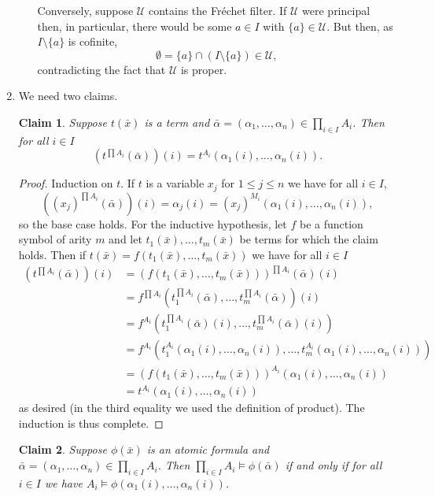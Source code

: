 \documentclass{article}
\theoremstyle{theorem}
\newtheorem{claim}{Claim}
\begin{document}
\begin{enumerate}[leftmargin=*]
\begin{enumerate}
			Conversely, suppose $\mathcal{U}$ contains the Fréchet filter. If $\mathcal{U}$ were principal then, in particular, there would be some $a\in I$ with $\{a\}\in\mathcal{U}$. But then, as $I\setminus\{a\}$ is cofinite,
			\[
				\emptyset= \{a\} \cap (I \setminus\{a\}) \in\mathcal{U},
			\]
			contradicting the fact that $\mathcal{U}$ is proper.
		\end{enumerate}
		\item We need two claims.
		\begin{claim}
			Suppose $t(\bar{x})$ is a term and $\bar{\alpha} = (\alpha_1,\ldots,\alpha_n)\in \prod_{i\in I} A_i$. Then for all $i\in I$
			\[
				\left(t^{\prod A_i}(\bar{\alpha})\right)(i) = t^{A_i}(\alpha_1(i),\ldots,\alpha_n(i)).
			\]
		\end{claim}
		\begin{proof}
			Induction on $t$. If $t$ is a variable $x_j$ for $1\leq j\leq n$ we have for all $i\in I$,
			\[
				\left((x_j)^{\prod A_i}(\bar{\alpha})\right)(i) =\alpha_j(i) = (x_j)^{M_i}(\alpha_1(i),\ldots,\alpha_n(i)), 
			\]
			so the base case holds. For the inductive hypothesis, let $f$ be a function symbol of arity $m$ and let $t_1(\bar{x}),\ldots, t_m(\bar{x})$ be terms for which the claim holds. Then if $t(\bar{x}) = f(t_1(\bar{x}),\ldots, t_m(\bar{x}))$ we have for all $i\in I$
			\begin{align*}
				\left(t^{\prod A_i}(\bar{\alpha})\right)(i) &= (f(t_1(\bar{x}),\ldots,t_m(\bar{x})))^{\prod A_i}(\bar{\alpha})(i) \\
				&= f^{\prod A_i}(t_1^{\prod A_i}(\bar{\alpha}), \ldots, t_m^{\prod A_i}(\bar{\alpha}))(i)\\
				&= f^{A_i}(t_1^{\prod A_i}(\bar{\alpha})(i), \ldots, t_m^{\prod A_i}(\bar{\alpha})(i))\\
				&= f^{A_i}(t_1^{A_i}(\alpha_1(i),\ldots, \alpha_n(i)),\ldots, t_m^{A_i}(\alpha_1(i),\ldots, \alpha_n(i)))\\
				&= (f(t_1(\bar{x}),\ldots,t_m(\bar{x})))^{A_i}(\alpha_1(i),\ldots, \alpha_n(i))\\
				&= t^{A_i}(\alpha_1(i),\ldots, \alpha_n(i))
			\end{align*}
			as desired (in the third equality we used the definition of product). The induction is thus complete.
		\end{proof}
		\begin{claim}
			Suppose $\phi(\bar{x})$ is an atomic formula and $\bar{\alpha} = (\alpha_1,\ldots,\alpha_n)\in \prod_{i\in I} A_i$. Then $\prod_{i\in I} A_i\models \phi(\bar{\alpha})$ if and only if for all $i\in I$ we have $A_i \models \phi(\alpha_1(i), \ldots,\alpha_n(i))$.  

\end{claim}
\end{enumerate}
\end{document}
